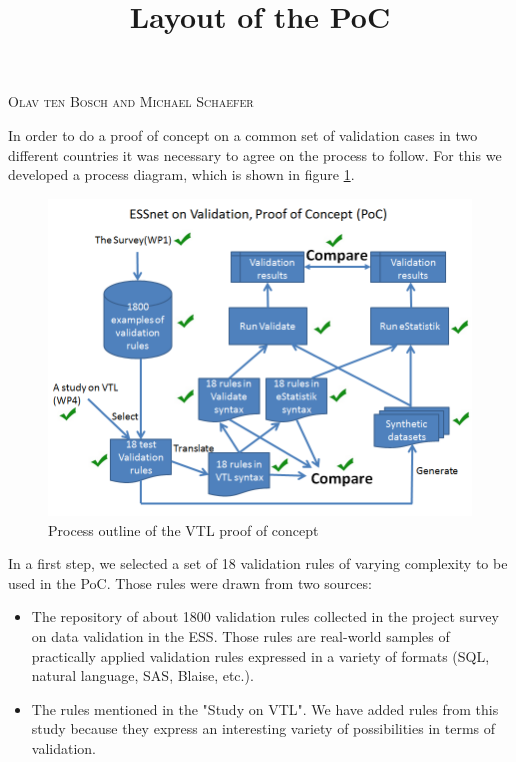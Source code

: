 \title{Layout of the PoC}
\textsc{Olav ten Bosch and Michael Schaefer}
\vspace{0.6cm}

In order to do a proof of concept on a common set of validation cases in two different countries it was necessary to agree on the process to follow. For this we developed a process diagram, which is shown in figure \ref{pocprocess}.


\begin{figure}[h!]
\begin{center}
\includegraphics[scale=0.5]{20151207ESSnetPoCProcess.PNG} 
\end{center}
\caption{Process outline of the VTL proof of concept}
\label{pocprocess}
\end{figure}

In a first step, we selected a set of 18 validation rules of varying complexity
to be used in the PoC. Those rules were drawn from two sources:

\begin{itemize}
\item
The repository of about 1800 validation rules collected in the project survey on
data validation in the ESS. Those rules are real-world samples of practically
applied validation rules expressed in a variety of formats (SQL, natural language,
SAS, Blaise, etc.).
\item
The rules mentioned in the "Study on VTL". We have added rules from this study
because they express an interesting variety of possibilities in terms of validation.
\end{itemize}

